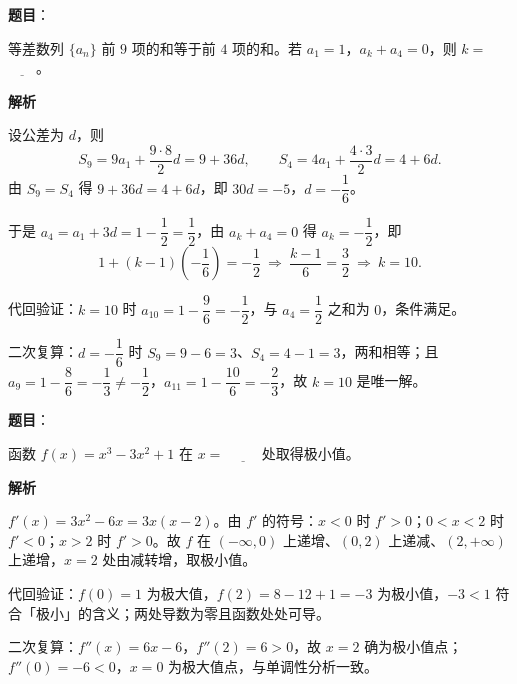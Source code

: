 \begin{answer}

\textbf{题目}：

等差数列 $\{a_n\}$ 前 $9$ 项的和等于前 $4$ 项的和。若 $a_1=1$，$a_k+a_4=0$，则 $k=$ $\underline{\qquad}$。

\textbf{解析}

设公差为 $d$，则
\nopagebreak[4]
\[S_9=9a_1+\frac{9\cdot8}{2}d=9+36d,\qquad S_4=4a_1+\frac{4\cdot3}{2}d=4+6d.\]
由 $S_9=S_4$ 得 $9+36d=4+6d$，即 $30d=-5$，$d=-\dfrac16$。

于是 $a_4=a_1+3d=1-\dfrac12=\dfrac12$，由 $a_k+a_4=0$ 得 $a_k=-\dfrac12$，即
\nopagebreak[4]
\[1+(k-1)\left(-\frac16\right)=-\frac12\ \Longrightarrow\ \frac{k-1}{6}=\frac32\ \Longrightarrow\ k=10.\]

代回验证：$k=10$ 时 $a_{10}=1-\dfrac96=-\dfrac12$，与 $a_4=\dfrac12$ 之和为 $0$，条件满足。

二次复算：$d=-\dfrac16$ 时 $S_9=9-6=3$、$S_4=4-1=3$，两和相等；且 $a_9=1-\dfrac86=-\dfrac13\ne-\dfrac12$，$a_{11}=1-\dfrac{10}{6}=-\dfrac23$，故 $k=10$ 是唯一解。


\end{answer}
\begin{answer}

\textbf{题目}：

函数 $f(x)=x^3-3x^2+1$ 在 $x=$ $\underline{\qquad}$ 处取得极小值。

\textbf{解析}

$f'(x)=3x^2-6x=3x(x-2)$。由 $f'$ 的符号：$x<0$ 时 $f'>0$；$0<x<2$ 时 $f'<0$；$x>2$ 时 $f'>0$。故 $f$ 在 $(-\infty,0)$ 上递增、$(0,2)$ 上递减、$(2,+\infty)$ 上递增，$x=2$ 处由减转增，取极小值。

代回验证：$f(0)=1$ 为极大值，$f(2)=8-12+1=-3$ 为极小值，$-3<1$ 符合「极小」的含义；两处导数为零且函数处处可导。

二次复算：$f''(x)=6x-6$，$f''(2)=6>0$，故 $x=2$ 确为极小值点；$f''(0)=-6<0$，$x=0$ 为极大值点，与单调性分析一致。


\end{answer}
